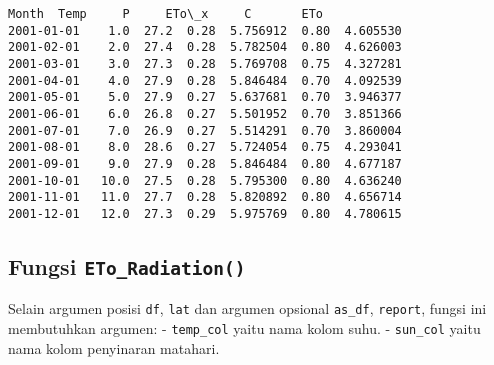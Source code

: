 \documentclass[11pt]{article}
\makeatletter
\newcommand{\boxspacing}{\kern\kvtcb@left@rule\kern\kvtcb@boxsep}
\newcommand{\prompt}[4]{
        {\ttfamily\llap{{\color{#2}[#3]:\hspace{3pt}#4}}\vspace{-\baselineskip}}
    }
\makeatother
\begin{document}
            \begin{tcolorbox}[breakable, size=fbox, boxrule=.5pt, pad at break*=1mm, opacityfill=0]
\prompt{Out}{outcolor}{ }{\boxspacing}
\begin{Verbatim}[commandchars=\\\{\}]
            Month  Temp     P     ETo\_x     C       ETo
2001-01-01    1.0  27.2  0.28  5.756912  0.80  4.605530
2001-02-01    2.0  27.4  0.28  5.782504  0.80  4.626003
2001-03-01    3.0  27.3  0.28  5.769708  0.75  4.327281
2001-04-01    4.0  27.9  0.28  5.846484  0.70  4.092539
2001-05-01    5.0  27.9  0.27  5.637681  0.70  3.946377
2001-06-01    6.0  26.8  0.27  5.501952  0.70  3.851366
2001-07-01    7.0  26.9  0.27  5.514291  0.70  3.860004
2001-08-01    8.0  28.6  0.27  5.724054  0.75  4.293041
2001-09-01    9.0  27.9  0.28  5.846484  0.80  4.677187
2001-10-01   10.0  27.5  0.28  5.795300  0.80  4.636240
2001-11-01   11.0  27.7  0.28  5.820892  0.80  4.656714
2001-12-01   12.0  27.3  0.29  5.975769  0.80  4.780615
\end{Verbatim}
\end{tcolorbox}
        
    \hypertarget{fungsi-eto_radiation}{%
\subsection{\texorpdfstring{Fungsi
\texttt{ETo\_Radiation()}}{Fungsi ETo\_Radiation()}}\label{fungsi-eto_radiation}}

Selain argumen posisi \texttt{df}, \texttt{lat} dan argumen opsional
\texttt{as\_df}, \texttt{report}, fungsi ini membutuhkan argumen: -
\texttt{temp\_col} yaitu nama kolom suhu. - \texttt{sun\_col} yaitu nama
kolom penyinaran matahari.
\end{document}
